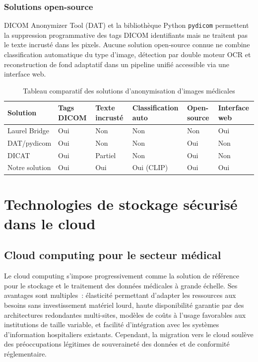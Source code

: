 \subsubsection{Solutions open-source}

DICOM Anonymizer Tool (DAT) et la bibliothèque Python \texttt{pydicom} permettent la suppression programmative des tags DICOM identifiants mais ne traitent pas le texte incrusté dans les pixels. Aucune solution open-source connue ne combine classification automatique du type d'image, détection par double moteur OCR et reconstruction de fond adaptatif dans un pipeline unifié accessible via une interface web.

\begin{table}[H]
\centering
\caption{Tableau comparatif des solutions d'anonymisation d'images médicales}
\label{tab:comparatif_solutions}
\begin{tabularx}{\textwidth}{p{3cm} p{1.8cm} p{2cm} p{2.5cm} p{2cm} p{2cm}}
\toprule
\textbf{Solution} & \textbf{Tags DICOM} & \textbf{Texte incrusté} & \textbf{Classification auto} & \textbf{Open-source} & \textbf{Interface web} \\
\midrule
Laurel Bridge  & Oui & Non     & Non       & Non & Oui \\
DAT/pydicom    & Oui & Non     & Non       & Oui & Non \\
DICAT          & Oui & Partiel & Non       & Oui & Non \\
Notre solution & Oui & Oui     & Oui (CLIP)& Oui & Oui \\
\bottomrule
\end{tabularx}
\end{table}

\section{Technologies de stockage sécurisé dans le cloud}

\subsection{Cloud computing pour le secteur médical}

Le cloud computing s'impose progressivement comme la solution de référence pour le stockage et le traitement des données médicales à grande échelle. Ses avantages sont multiples~: élasticité permettant d'adapter les ressources aux besoins sans investissement matériel lourd, haute disponibilité garantie par des architectures redondantes multi-sites, modèles de coûts à l'usage favorables aux institutions de taille variable, et facilité d'intégration avec les systèmes d'information hospitaliers existants. Cependant, la migration vers le cloud soulève des préoccupations légitimes de souveraineté des données et de conformité réglementaire.

